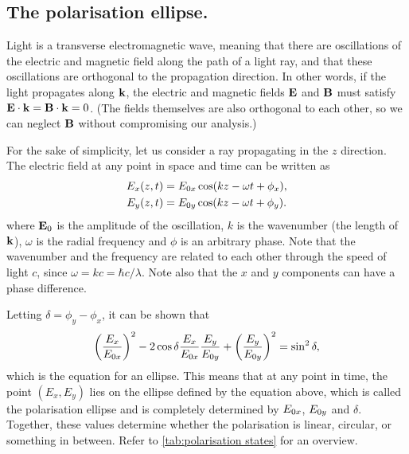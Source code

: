 \subsection{The polarisation ellipse.} Light is a transverse electromagnetic wave, meaning that there are oscillations of the electric and magnetic field along the path of a light ray, and that these oscillations are orthogonal to the propagation direction. In other words, if the light propagates along $\vb{k}$, the electric and magnetic fields $\vb{E}$ and $\vb{B}$ must satisfy $ \vb{E} \cdot \vb{k} = \vb{B} \cdot \vb{k} = 0$. (The fields themselves are also orthogonal to each other, so we can neglect $ \vb{B} $ without compromising our analysis.)

For the sake of simplicity, let us consider a ray propagating in the $ z $ direction. The electric field at any point in space and time can be written as
\begin{align}
	E_x(z, t) &= E_{0x} \cos(kz-\omega t + \phi_x),\\
	E_y(z, t) &= E_{0y} \cos(kz-\omega t + \phi_y).
\end{align}
where $ \vb{E}_0 $ is the amplitude of the oscillation, $ k $ is the wavenumber (the length of $ \vb{k} $), $ \omega $ is the radial frequency and $ \phi $ is an arbitrary phase. Note that the wavenumber and the frequency are related to each other through the speed of light $ c $, since $ \omega = kc = \hbar c/\lambda$. Note also that the $ x $ and $ y $ components can have a phase difference.

Letting $ \delta = \phi_y-\phi_x $, it can be shown that 
\begin{equation}
	\left(\frac{E_x}{E_{0x}}\right)^2 - 2\cos\delta\frac{E_x}{E_{0x}}\frac{E_y}{E_{0y}} + \left(\frac{E_y}{E_{0y}}\right)^2 = \sin^2\delta,
\end{equation}
which is the equation for an ellipse. This means that at any point in time, the point $ (E_x, E_y) $ lies on the ellipse defined by the equation above, which is called the polarisation ellipse and is completely determined by $ E_{0x} $, $ E_{0y} $ and $ \delta $. Together, these values determine whether the polarisation is linear, circular, or something in between. Refer to \autoref{tab:polarisation states} for an overview.

